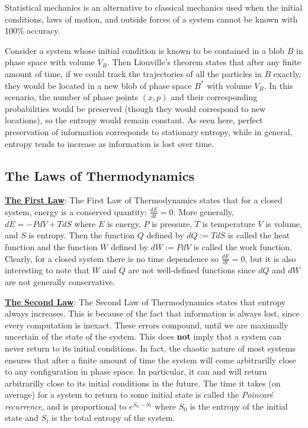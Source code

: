 \documentclass[12pt]{article}
\begin{document}
Statistical mechanics is an alternative to classical mechanics used when the
initial conditions, laws of motion, and outside forces of a system cannot
be known with 100\% accuracy.

Consider a system whose initial condition is known to be contained in 
a blob $B$ in phase space with volume $V_B$.
Then Liouville's theorem states that after any finite amount of time,
if we could track the trajectories of all the particles in $B$ exactly,
they would be located in a new blob of phase space $B^*$ with volume $V_B$.
In this scenario, the number of phase points $(x, p)$ and their corresponding
probabilities would be preserved (though they would correspond to new
locations), so the entropy would remain constant.
As seen here, perfect preservation of information corresponds to stationary
entropy, while in general, entropy tends to increase as information is lost
over time.

\subsection*{The Laws of Thermodynamics}

\underline{\bf The First Law}:
The First Law of Thermodynamics states that for a closed system, energy is a 
conserved quantity: $\frac{dE}{dt} = 0$.
More generally, $dE = -P dV + T dS$ where $E$ is energy, $P$ is pressure, $T$
is temperature $V$ is volume, and $S$ is entropy.
Then the function $Q$ defined by $dQ := T dS$ is called the heat function and
the function $W$ defined by $dW := P dV$ is called the work function.
Clearly, for a closed system there is no time dependence so $\frac{dE}{dt} = 0$,
but it is also interesting to note that $W$ and $Q$ are not well-defined
functions since $dQ$ and $dW$ are not generally conservative.

\underline{\bf The Second Law}:
The Second Law of Thermodynamics states that entropy always increases.
This is because of the fact that information is always lost, since every
computation is inexact.
These errors compound, until we are maximally uncertain of the state of the
system.
This does {\bf not} imply that a system can never return to its initial 
conditions.
In fact, the chaotic nature of most systems ensures that after a finite amount
of time the system will come arbitrarilly close to any configuration in phase
space.
In particular, it can and will return arbitrarilly close to its initial
conditions in the future.
The time it takes (on average) for a system to return to some initial state
is called the {\it Poincar{\'e} recurrence}, and is proportional to
$e^{S_0 - S_t}$ where $S_0$ is the entropy of the initial state and $S_t$ is
the total entropy of the system.
\end{document}
